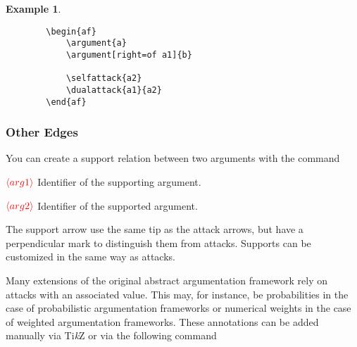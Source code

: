 \documentclass[headings=normal]{scrartcl}
\newcommand{\tikzname}{Ti\emph{k}Z\xspace}
\newcommand{\opt}[2][red]{\ensuremath{\textcolor{#1}{\langle #2\rangle}}}
\newtheorem{example}{Example}
\newcommand{\makecmd}[1]{\textbackslash\hspace{-1ex}#1}
\newenvironment{command}[1]{
    \medskip\medskip
    \hspace{-1.5cm}{\ttfamily \makecmd{#1}}
    \begin{description}[labelindent=1.5cm,labelsep=0.5em, align=right]
}{%
    \end{description}
    \medskip
}
\begin{document}
    \begin{example}~

    \begin{minipage}{0.4\textwidth}
        \begin{center}
        \begin{af}
    
        \end{af}
        \end{center}
    \end{minipage}%
    \begin{minipage}{0.5\textwidth}
        \begin{verbatim}
        \begin{af}
            \argument{a}
            \argument[right=of a1]{b}
    
            \selfattack{a2}
            \dualattack{a1}{a2}
        \end{af}  
        \end{verbatim}
    \end{minipage}
    \end{example}
    

\subsubsection{Other Edges}
    You can create a support relation between two arguments with the command

    \begin{command}{
        support\{\opt{arg1}\}\{\opt{arg2}\}
    }
        \item[\opt{arg1}] Identifier of the supporting argument.
        \item[\opt{arg2}] Identifier of the supported argument.
    \end{command}

    The support arrow use the same tip as the attack arrows, but have a perpendicular mark to distinguish them from attacks.
    Supports can be customized in the same way as attacks.

    Many extensions of the original abstract argumentation framework rely on attacks with an associated value.
    This may, for instance, be probabilities in the case of probabilistic argumentation frameworks or numerical weights in the case of weighted argumentation frameworks.
    These annotations can be added manually via \tikzname or via the following command
\end{document}
